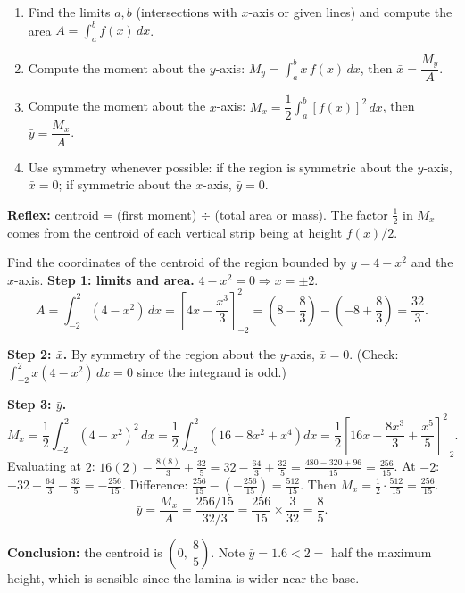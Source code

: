 \documentclass[11pt]{article}
\begin{document}
\begin{methode}[Centroid of a plane region under $y=f(x)$]
\begin{enumerate}
\item Find the limits $a,b$ (intersections with $x$-axis or given lines) and compute the area $A = \int_a^b f(x)\,dx$.
\item Compute the moment about the $y$-axis: $M_y = \displaystyle\int_a^b x\,f(x)\,dx$, then $\bar{x} = \dfrac{M_y}{A}$.
\item Compute the moment about the $x$-axis: $M_x = \dfrac{1}{2}\displaystyle\int_a^b [f(x)]^2\,dx$, then $\bar{y} = \dfrac{M_x}{A}$.
\item Use symmetry whenever possible: if the region is symmetric about the $y$-axis, $\bar{x}=0$; if symmetric about the $x$-axis, $\bar{y}=0$.
\end{enumerate}
\textbf{Reflex:} centroid = (first moment) $\div$ (total area or mass). The factor $\tfrac12$ in $M_x$ comes from the centroid of each vertical strip being at height $f(x)/2$.
\end{methode}

\begin{exemplebox}
Find the coordinates of the centroid of the region bounded by $y = 4 - x^2$ and the $x$-axis.
\tcblower
\textbf{Step 1: limits and area.} $4 - x^2 = 0 \Rightarrow x = \pm 2$.
\[
A = \int_{-2}^{2}(4-x^2)\,dx = \left[4x - \frac{x^3}{3}\right]_{-2}^{2} = \left(8-\frac{8}{3}\right) - \left(-8+\frac{8}{3}\right) = \frac{32}{3}.
\]

\textbf{Step 2: $\bar{x}$.} By symmetry of the region about the $y$-axis, $\bar{x} = 0$. (Check: $\int_{-2}^{2} x(4-x^2)\,dx = 0$ since the integrand is odd.)

\textbf{Step 3: $\bar{y}$.}
\[
M_x = \frac{1}{2}\int_{-2}^{2}(4-x^2)^2\,dx = \frac{1}{2}\int_{-2}^{2}\left(16 - 8x^2 + x^4\right)dx = \frac{1}{2}\left[16x - \frac{8x^3}{3} + \frac{x^5}{5}\right]_{-2}^{2}.
\]
Evaluating at $2$: $16(2) - \frac{8(8)}{3} + \frac{32}{5} = 32 - \frac{64}{3} + \frac{32}{5} = \frac{480 - 320 + 96}{15} = \frac{256}{15}$.
At $-2$: $-32 + \frac{64}{3} - \frac{32}{5} = -\frac{256}{15}$.
Difference: $\frac{256}{15} - (-\frac{256}{15}) = \frac{512}{15}$. Then $M_x = \frac{1}{2} \cdot \frac{512}{15} = \frac{256}{15}$.
\[
\bar{y} = \frac{M_x}{A} = \frac{256/15}{32/3} = \frac{256}{15}\times\frac{3}{32} = \frac{8}{5}.
\]

\textbf{Conclusion:} the centroid is $\left(0,\ \dfrac{8}{5}\right)$. Note $\bar{y} = 1.6 < 2 = $ half the maximum height, which is sensible since the lamina is wider near the base.
\end{exemplebox}
\end{document}
